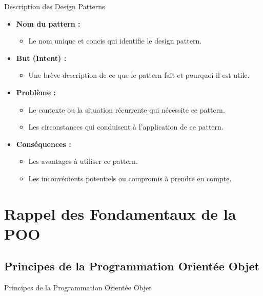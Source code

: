 \documentclass[aspectratio=169]{beamer}
\begin{document}
\begin{frame}{Description des Design Patterns}
    \begin{itemize}
        \item \textbf{Nom du pattern :}
        \begin{itemize}
            \item Le nom unique et concis qui identifie le design pattern.
        \end{itemize}

        \item \textbf{But (Intent) :}
        \begin{itemize}
            \item Une brève description de ce que le pattern fait et pourquoi il est utile.
        \end{itemize}

        \item \textbf{Problème :}
        \begin{itemize}
            \item Le contexte ou la situation récurrente qui nécessite ce pattern.
            \item Les circonstances qui conduisent à l'application de ce pattern.
        \end{itemize}

        \item \textbf{Conséquences :}
        \begin{itemize}
            \item Les avantages à utiliser ce pattern.
            \item Les inconvénients potentiels ou compromis à prendre en compte.
        \end{itemize}
    \end{itemize}
\end{frame}

\section{Rappel des Fondamentaux de la POO}

\subsection{Principes de la Programmation Orientée Objet}

\begin{frame}{Principes de la Programmation Orientée Objet}
\end{frame}
\end{document}
